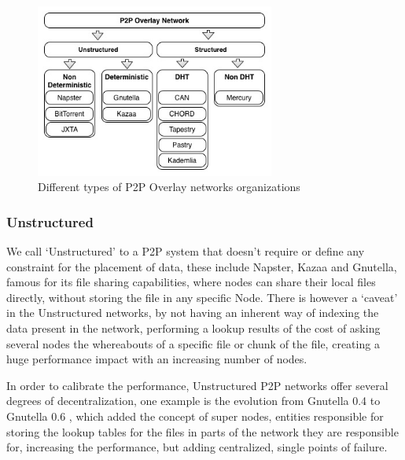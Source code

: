 \begin{figure}[h!]
  \begin{center}
    \includegraphics[width=0.70\textwidth]{./img/p2porganizations.jpg}
  \end{center}
  \caption{Different types of P2P Overlay networks organizations}
  \label{fig:Different types of P2P Overlay networks organizations}
\end{figure}


\subsubsection{Unstructured}\label{par:Unstructured}

We call `Unstructured' to a P2P system that doesn't require or define any constraint for the placement of data, these include Napster, Kazaa and Gnutella, famous for its file sharing capabilities, where nodes can share their local files directly, without storing the file in any specific Node. There is however a `caveat' in the Unstructured networks, by not having an inherent way of indexing the data present in the network, performing a lookup results of the cost of asking several nodes the whereabouts of a specific file or chunk of the file, creating a huge performance impact with an increasing number of nodes. 

In order to calibrate the performance, Unstructured P2P networks offer several degrees of decentralization, one example is the evolution from Gnutella 0.4\cite{Definition2003} to Gnutella 0.6 \cite{T.Klingberg2002}\cite{Ripeanu2002a}, which added the concept of super nodes, entities responsible for storing the lookup tables for the files in parts of the network they are responsible for, increasing the performance, but adding centralized, single points of failure. 

